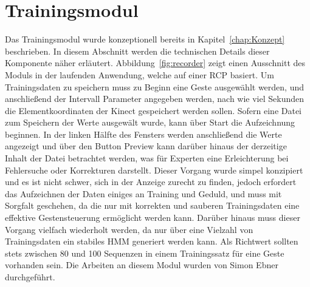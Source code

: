 \section{Trainingsmodul}
Das Trainingsmodul wurde konzeptionell bereits in Kapitel~\ref{chap:Konzept} beschrieben. In diesem Abschnitt werden die technischen Details dieser Komponente n\"aher erl\"autert.
\newline
Abbildung~\ref{fig:recorder} zeigt einen Ausschnitt des Moduls in der laufenden Anwendung, welche auf einer \gls{RCP} basiert.
\newline
Um Trainingsdaten zu speichern muss zu Beginn eine Geste ausgew\"ahlt werden, und anschlie\ss end der Intervall Parameter angegeben werden, nach wie viel Sekunden die Elementkoordinaten der Kinect gespeichert werden sollen. Sofern eine Datei zum Speichern der Werte ausgew\"alt wurde, kann \"uber Start die Aufzeichnung beginnen. In der linken H\"alfte des Fensters werden anschlie\ss end die Werte angezeigt und \"uber den Button Preview kann dar\"uber hinaus der derzeitige Inhalt der Datei betrachtet werden, was f\"ur Experten eine Erleichterung bei Fehlersuche oder Korrekturen darstellt.
\newline
Dieser Vorgang wurde simpel konzipiert und es ist nicht schwer, sich in der Anzeige zurecht zu finden, jedoch erfordert das Aufzeichnen der Daten einiges an Training und Geduld, und muss mit Sorgfalt geschehen, da die nur mit korrekten und sauberen Trainingsdaten eine effektive Gestensteuerung erm\"oglicht werden kann. Dar\"uber hinaus muss dieser Vorgang vielfach wiederholt werden, da nur \"uber eine Vielzahl von Trainingsdaten ein stabiles \gls{HMM} generiert werden kann. Als Richtwert sollten stets zwischen 80 und 100 Sequenzen in einem Trainingssatz f\"ur eine Geste vorhanden sein.
\newline
Die Arbeiten an diesem Modul wurden von Simon Ebner durchgef\"uhrt.

